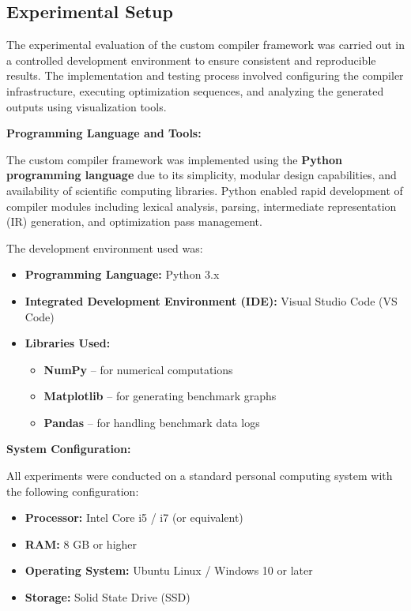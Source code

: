 \documentclass[conference]{IEEEtran}
\begin{document}
\subsection{Experimental Setup}

The experimental evaluation of the custom compiler framework was carried out in a controlled development environment to ensure consistent and reproducible results. The implementation and testing process involved configuring the compiler infrastructure, executing optimization sequences, and analyzing the generated outputs using visualization tools.

\textbf{Programming Language and Tools:}

The custom compiler framework was implemented using the \textbf{Python programming language} due to its simplicity, modular design capabilities, and availability of scientific computing libraries. Python enabled rapid development of compiler modules including lexical analysis, parsing, intermediate representation (IR) generation, and optimization pass management.

The development environment used was:

\begin{itemize}

\item \textbf{Programming Language:} Python 3.x  
\item \textbf{Integrated Development Environment (IDE):} Visual Studio Code (VS Code)  
\item \textbf{Libraries Used:}
    \begin{itemize}
        \item \textbf{NumPy} – for numerical computations
        \item \textbf{Matplotlib} – for generating benchmark graphs
        \item \textbf{Pandas} – for handling benchmark data logs
    \end{itemize}

\end{itemize}

\textbf{System Configuration:}

All experiments were conducted on a standard personal computing system with the following configuration:

\begin{itemize}

\item \textbf{Processor:} Intel Core i5 / i7 (or equivalent)
\item \textbf{RAM:} 8 GB or higher
\item \textbf{Operating System:} Ubuntu Linux / Windows 10 or later
\item \textbf{Storage:} Solid State Drive (SSD)

\end{itemize}
\end{document}
